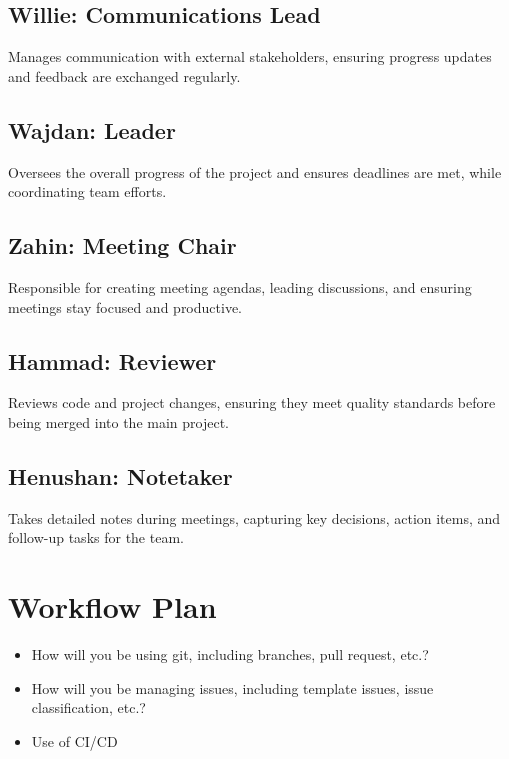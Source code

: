 \documentclass{article}
\begin{document}
\subsection*{Willie: Communications Lead}
Manages communication with external stakeholders, ensuring progress updates and feedback are exchanged regularly.

\subsection*{Wajdan: Leader}
Oversees the overall progress of the project and ensures deadlines are met, while coordinating team efforts.

\subsection*{Zahin: Meeting Chair}
Responsible for creating meeting agendas, leading discussions, and ensuring meetings stay focused and productive.

\subsection*{Hammad: Reviewer}
Reviews code and project changes, ensuring they meet quality standards before being merged into the main project.

\subsection*{Henushan: Notetaker}
Takes detailed notes during meetings, capturing key decisions, action items, and follow-up tasks for the team.


\section{Workflow Plan}

\begin{itemize}
	\item How will you be using git, including branches, pull request, etc.?
	\item How will you be managing issues, including template issues, issue
	classification, etc.?
  \item Use of CI/CD
\end{itemize}
\end{document}
